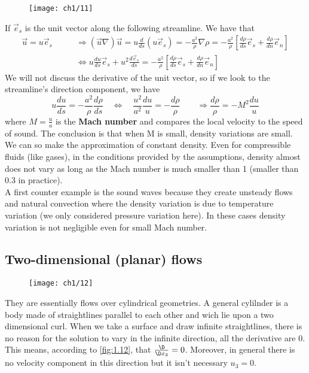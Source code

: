 		\begin{wrapfigure}[4]{l}{2cm}
		\vspace{-5mm}
		\texttt{[image: ch1/11]}
		\end{wrapfigure}
		If $\vec{e}_s$ is the unit vector along the following streamline. We have that 
		\begin{equation}
		\begin{aligned}
			\vec{u}= u \vec{e}_s 
			\qquad &\Rightarrow (\vec{u}\nabla)\vec{u} = u \frac{d}{ds}(u\vec{e}_s) = -\frac{a^2}{\rho} \nabla \rho = -\frac{a^2}{\rho}\left[ \frac{d\rho}{ds}\vec{e}_s + \frac{d\rho}{dn} \vec{e}_n \right]\\
			&\Leftrightarrow u\frac{du}{ds}\vec{e}_s + u^2\frac{d\vec{e}_s}{ds} =  -\frac{a^2}{\rho}\left[ \frac{d\rho}{ds}\vec{e}_s + \frac{d\rho}{dn} \vec{e}_n \right]
			\end{aligned}
		\end{equation}
		We will not discuss the derivative of the unit vector, so if we look to the streamline's direction component, we have
		\begin{equation}
			u\frac{du}{ds} = -\frac{a^2}{\rho} \frac{d\rho}{ds} \quad \Leftrightarrow \quad \frac{u^2}{a^2}\frac{du}{u} = - \frac{d\rho}{\rho} \qquad \Rightarrow \frac{d\rho}{\rho} = -M^2 \frac{du}{u}
		\end{equation}
		where $M = \frac{u}{a}$ is the \textbf{Mach number} and compares the local velocity to the speed of sound. The conclusion is that when M is small, density variations are small. We can so make the approximation of constant density. Even for compressible fluids (like gases), in the conditions provided by the assumptions, density almost does not vary as long as the Mach number is much smaller than 1 (smaller than 0.3 in practice). \\
		A first counter example is the sound waves because they create unsteady flows and natural convection where the density variation is due to temperature variation (we only considered pressure variation here). In these cases density variation is not negligible even for small Mach number. 
		
	\subsection{Two-dimensional (planar) flows}
	
		\begin{wrapfigure}[7]{r}{2.8cm}
		\vspace{-5mm}
		\texttt{[image: ch1/12]}
		\label{fig:1.12}
		\end{wrapfigure}
		They are essentially flows over cylindrical geometries. A general cylilnder is a body made of straightlines parallel to each other and wich lie upon a two dimensional curl. When we take a surface and draw infinite straightlines, there is no reason for the solution to vary in the infinite direction, all the derivative are 0. This means, according to \autoref{fig:1.12}, that $\frac{\D}{\D x_3}=0$. Moreover, in general there is no velocity component in this direction but it isn't necessary $u_3 = 0$.\\
		

